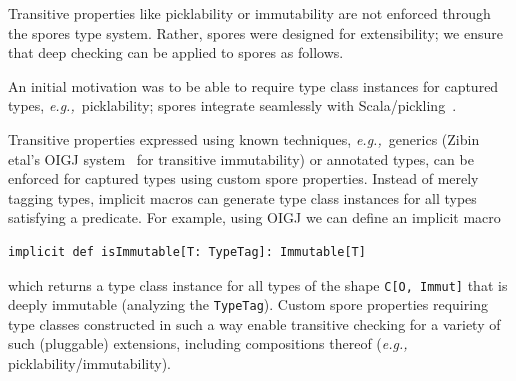 \documentclass[runningheads]{llncs}
\newcommand{\eg}{{\em e.g.,~}}
\begin{document}
\begin{sloppypar}
Transitive properties like picklability or immutability are not enforced
through the spores type system. Rather, spores were designed for extensibility;
we ensure that deep checking can be applied to spores as follows.

An initial motivation was to be able to require type class instances for
captured types, \eg picklability; spores integrate seamlessly with
Scala/pickling~\cite{ScalaPickling}.

Transitive properties expressed using known techniques, \eg generics (Zibin
etal's OIGJ system~\cite{ZibinPLAE10} for transitive immutability) or annotated types, can be
enforced for captured types using custom spore properties. Instead of merely
tagging types, implicit macros can generate type class instances for all types
satisfying a predicate. For example, using OIGJ we can define an implicit macro

\begin{lstlisting}[numbers=none]
implicit def isImmutable[T: TypeTag]: Immutable[T]
\end{lstlisting}

which returns a type class instance for all types of the shape \verb|C[O, Immut]|
that is deeply immutable (analyzing the \verb|TypeTag|). Custom spore properties
requiring type classes constructed in such a way enable transitive checking for
a variety of such (pluggable) extensions, including compositions thereof (\eg
picklability/immutability).







\end{sloppypar}
\end{document}
